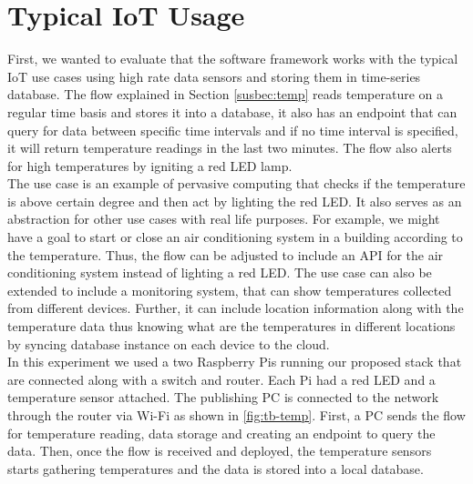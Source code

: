 \section{Typical IoT Usage}

First, we wanted to evaluate that the software framework works with the typical IoT use cases using high rate data sensors and storing them in time-series database. The flow explained in Section  \ref{susbec:temp}  reads temperature on a regular time basis and stores it into a database, it also has an endpoint that can query for data between specific time intervals and if no time interval is specified, it will return temperature readings in the last two minutes. The flow also alerts for high temperatures by igniting a red LED lamp. \\

\noindent The use case is an example of pervasive computing that checks if the temperature is above certain degree and then act by lighting the red LED. It also serves as an abstraction for other use cases with real life purposes. For example, we might have a goal to start or close an air conditioning system in a building according to the temperature. Thus, the flow can be adjusted to include an API for the air conditioning system instead of lighting a red LED. The use case can also be extended to include a monitoring system, that can show temperatures collected from different devices. Further, it can include location information along with the temperature data thus knowing what are the temperatures in different locations by syncing database instance on each device to the cloud.\\

\noindent In this experiment we used a two Raspberry Pis running our proposed stack that are connected along with a switch and router. Each Pi had a red LED and a temperature sensor attached. The publishing PC is connected to the network through the router via Wi-Fi as shown in \ref{fig:tb-temp}. First, a PC sends the flow for temperature reading, data storage and creating an endpoint to query the data. Then, once the flow is received and deployed, the temperature sensors starts gathering temperatures and the data is stored into a local database. 

